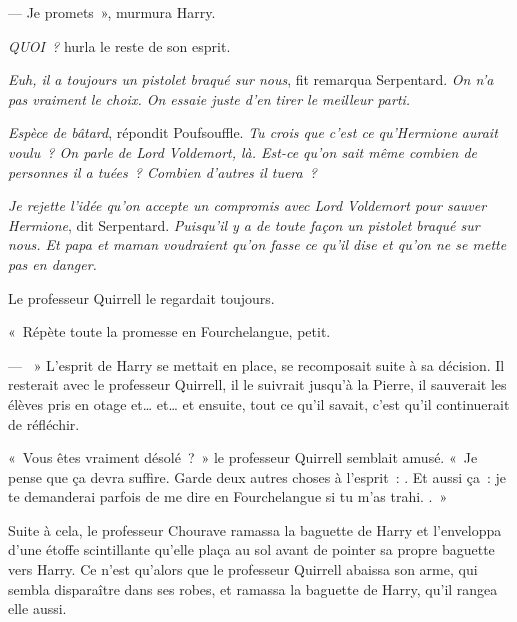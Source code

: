 --- Je promets~», murmura Harry.

\emph{QUOI~?} hurla le reste de son esprit.

\emph{Euh, il a toujours un pistolet braqué sur nous}, fit remarqua Serpentard.
\emph{On n'a pas vraiment le choix.
On essaie juste d'en tirer le meilleur parti.}

\emph{Espèce de bâtard}, répondit Poufsouffle.
\emph{Tu crois que c'est ce qu'Hermione aurait voulu~?
On parle de Lord Voldemort, là.
Est-ce qu'on sait même combien de personnes il a tuées~?
Combien d'autres il tuera~?}

\emph{Je rejette l'idée qu'on accepte un compromis avec Lord Voldemort pour sauver Hermione}, dit Serpentard.
\emph{Puisqu'il y a de toute façon un pistolet braqué sur nous.
Et papa et maman voudraient qu'on fasse ce qu'il dise et qu'on ne se mette pas en danger.}

Le professeur Quirrell le regardait toujours.

«~Répète toute la promesse en Fourchelangue, petit.

--- ~» L'esprit de Harry se mettait en place, se recomposait suite à sa décision.
Il resterait avec le professeur Quirrell, il le suivrait jusqu'à la Pierre, il sauverait les élèves pris en otage et… et… et ensuite, tout ce qu'il savait, c'est qu'il continuerait de réfléchir.

«~Vous êtes vraiment désolé~?~»
le professeur Quirrell semblait amusé.
«~Je pense que ça devra suffire.
Garde deux autres choses à l'esprit~: .
Et aussi ça~: je te demanderai parfois de me dire en Fourchelangue si tu m'as trahi.
.~»

\later

Suite à cela, le professeur Chourave ramassa la baguette de Harry et l'enveloppa d'une étoffe scintillante qu'elle plaça au sol avant de pointer sa propre baguette vers Harry.
Ce n'est qu'alors que le professeur Quirrell abaissa son arme, qui sembla disparaître dans ses robes, et ramassa la baguette de Harry, qu'il rangea elle aussi.


